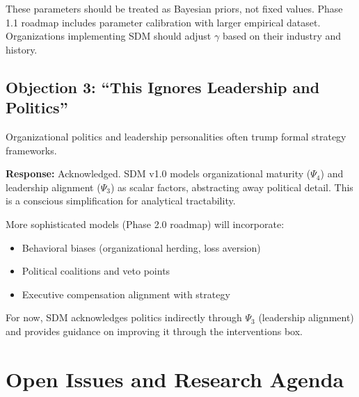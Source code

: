 These parameters should be treated as Bayesian priors, not fixed values. Phase 1.1 roadmap includes parameter calibration with larger empirical dataset. Organizations implementing SDM should adjust $\gamma$ based on their industry and history.

\subsection{Objection 3: ``This Ignores Leadership and Politics''}

\begin{tcolorbox}[colback=red!5!white, colframe=red!50!black,
    title=Objection: Model Omits Political Dynamics]
Organizational politics and leadership personalities often trump formal strategy frameworks.
\end{tcolorbox}

\textbf{Response:} Acknowledged. SDM v1.0 models organizational maturity ($\Psi_4$) and leadership alignment ($\Psi_3$) as scalar factors, abstracting away political detail. This is a conscious simplification for analytical tractability.

More sophisticated models (Phase 2.0 roadmap) will incorporate:
\begin{itemize}
    \item Behavioral biases (organizational herding, loss aversion)
    \item Political coalitions and veto points
    \item Executive compensation alignment with strategy
\end{itemize}

For now, SDM acknowledges politics indirectly through $\Psi_3$ (leadership alignment) and provides guidance on improving it through the interventions box.

\section{Open Issues and Research Agenda}
\label{sec:sdm-open}

